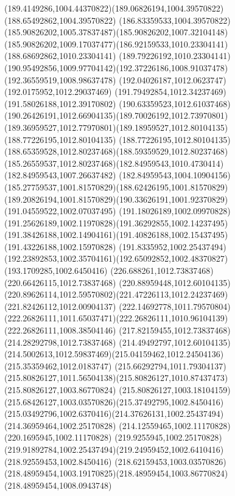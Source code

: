 {{	\curveto(189.4149286,1004.44370822)(189.06826194,1004.39570822)(188.65492862,1004.39570822)
	\curveto(186.83359533,1004.39570822)(185.90826202,1005.37837487)(185.90826202,1007.32104148)
	\curveto(185.90826202,1009.17037477)(186.92159533,1010.23304141)(188.68692862,1010.23304141)
	\curveto(189.79226192,1010.23304141)(190.95492856,1009.97704142)(192.37226186,1008.91037478)
	\lineto(192.36559519,1008.98637478)
	\lineto(192.04026187,1012.0623747)
	\lineto(192.0175952,1012.29037469)
	\lineto(191.79492854,1012.34237469)
	\lineto(191.58026188,1012.39170802)
	\curveto(190.63359523,1012.61037468)(190.26426191,1012.66904135)(189.70026192,1012.73970801)
	\curveto(189.36959527,1012.77970801)(189.18959527,1012.80104135)(188.77226195,1012.80104135)
	\curveto(188.77226195,1012.80104135)(188.65359528,1012.80237468)(188.59359529,1012.80237468)
	\curveto(185.26559537,1012.80237468)(182.84959543,1010.4730414)(182.84959543,1007.26637482)
	\curveto(182.84959543,1004.10904156)(185.27759537,1001.81570829)(188.62426195,1001.81570829)
	\curveto(189.20826194,1001.81570829)(190.33626191,1001.92370829)(191.04559522,1002.07037495)
	\curveto(191.18026189,1002.09970828)(191.25626189,1002.11970828)(191.36292855,1002.14237495)
	\curveto(191.38426188,1002.14904161)(191.40826188,1002.15437495)(191.43226188,1002.15970828)
	\curveto(191.8335952,1002.25437494)(192.23892853,1002.35704161)(192.65092852,1002.48370827)
	\lineto(193.1709285,1002.6450416)
	\closepath
	\moveto(226.688261,1012.73837468)
	\lineto(220.66426115,1012.73837468)
	\lineto(220.88959448,1012.60104135)
	\curveto(220.89626114,1012.59570802)(221.47226113,1012.24237469)(221.82426112,1012.00904137)
	\curveto(222.14692778,1011.79570804)(222.26826111,1011.65037471)(222.26826111,1010.96104139)
	\lineto(222.26826111,1008.38504146)
	\lineto(217.82159455,1012.73837468)
	\lineto(214.28292798,1012.73837468)
	\lineto(214.49492797,1012.60104135)
	\curveto(214.5002613,1012.59837469)(215.04159462,1012.24504136)(215.35359462,1012.0183747)
	\curveto(215.66292794,1011.79304137)(215.80826127,1011.56504138)(215.80826127,1010.87437473)
	\lineto(215.80826127,1003.86770824)
	\curveto(215.80826127,1003.18104159)(215.68426127,1003.03570826)(215.37492795,1002.8450416)
	\curveto(215.03492796,1002.6370416)(214.37626131,1002.25437494)(214.36959464,1002.25170828)
	\lineto(214.12559465,1002.11170828)
	\lineto(220.1695945,1002.11170828)
	\lineto(219.9255945,1002.25170828)
	\curveto(219.91892784,1002.25437494)(219.24959452,1002.6410416)(218.92559453,1002.8450416)
	\curveto(218.62159453,1003.03570826)(218.48959454,1003.19170825)(218.48959454,1003.86770824)
	\lineto(218.48959454,1008.0943748)
}}
